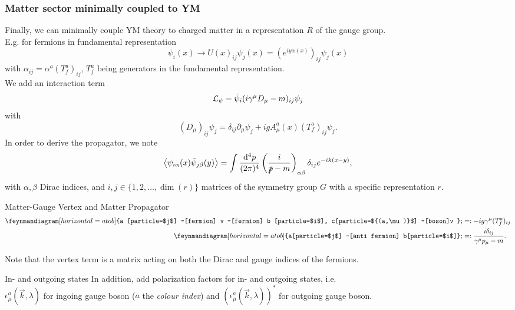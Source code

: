\subsubsection{Matter sector minimally coupled to YM }
Finally, we can minimally couple YM theory to charged matter in a representation $R$ of the gauge group.\\
E.g. for fermions in fundamental representation
\begin{equation}
	\psi_i(x) \rightarrow U(x)_{ij} \psi_j(x) = (e^{i y \alpha(x)})_{ij} \psi_j(x)
\end{equation}
with $\alpha_{ij} = \alpha^a (T^a_f)_{ij}$, $T^a_f$ being generators in the fundamental representation.\\
We add an interaction term
\begin{equation}
	\mathcal{L}_\psi = \bar{\psi}_i (i \gamma^\mu D_\mu -m)_{ij} \psi_j
\end{equation}
with 
\begin{equation}
	(D_\mu)_{ij} \psi_j = \delta_{ij} \partial_\mu \psi_j + i g A^a_\mu(x) (T^a_f)_{ij} \psi_j.
\end{equation}
In order to derive the propagator, we note
\begin{equation}
\expval{\psi_{i\alpha}(x) \bar{\psi}_{j\beta}(y)} = \int \frac{\mathrm{d}^4p }{(2 \pi)^4} \left(\frac{i}{\slashed{p}-m}\right)_{\alpha \beta} \delta_{ij} e^{-ik(x-y)},
\end{equation}
with $\alpha,\beta$ Dirac indices, and $i,j\in\{1,2,\dots,\dim(r) \}$ matrices of the symmetry group $G$ with a specific representation $r$.
\begin{mybox}{Matter-Gauge Vertex and Matter Propagator}
	\begin{align}
		\feynmandiagram[horizontal=a to b]{a [particle=$j$] --[fermion] v --[fermion] b [particle=$i$],
		c[particle=${(a,\mu)}$] --[boson]v }; &=: -i g \gamma^\mu (T^a_f)_{ij}\\
	\feynmandiagram[horizontal=a to b]{a[particle=$j$] --[anti fermion] b[particle=$i$]}; &=: \frac{i \delta_{ij}}{\gamma^\mu p_\mu - m}.
	\end{align}
\end{mybox}
Note that the vertex term is a matrix acting on both the Dirac and gauge indices of the fermions.
\begin{mybox}{In- and outgoing states}
In addition, add polarization factors for in- and outgoing states, i.e. \\
$\epsilon^a_\mu(\vec{k},\lambda)$ for ingoing gauge boson ($a$ the \emph{colour index}) and $(\epsilon^{a}_\mu(\vec{k},\lambda))^*$ for outgoing gauge boson.
\end{mybox}
